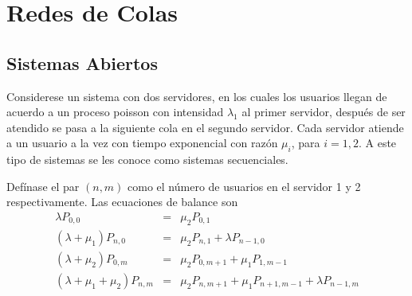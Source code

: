 
%
\section{Redes de Colas}

%
\subsection{Sistemas Abiertos}
%

Considerese un sistema con dos servidores, en los cuales los usuarios llegan de acuerdo a un proceso poisson con intensidad $\lambda_{1}$ al primer servidor, despu\'es de ser atendido se pasa a la siguiente cola en el segundo servidor. Cada servidor atiende a un usuario a la vez con tiempo exponencial con raz\'on $\mu_{i}$, para $i=1,2$. A este tipo de sistemas se les conoce como sistemas secuenciales.

Def\'inase el par $\left(n,m\right)$ como el n\'umero de usuarios en el servidor 1 y 2 respectivamente. Las ecuaciones de balance son
\begin{eqnarray}\label{Eq.Balance}
\lambda P_{0,0}&=&\mu_{2}P_{0,1}\\
\left(\lambda+\mu_{1}\right)P_{n,0}&=&\mu_{2}P_{n,1}+\lambda P_{n-1,0}\\
\left(\lambda+\mu_{2}\right)P_{0,m}&=&\mu_{2}P_{0,m+1}+\mu_{1}P_{1,m-1}\\
\left(\lambda+\mu_{1}+\mu_{2}\right)P_{n,m}&=&\mu_{2}P_{n,m+1}+\mu_{1}P_{n+1,m-1}+\lambda
P_{n-1,m}
\end{eqnarray}

